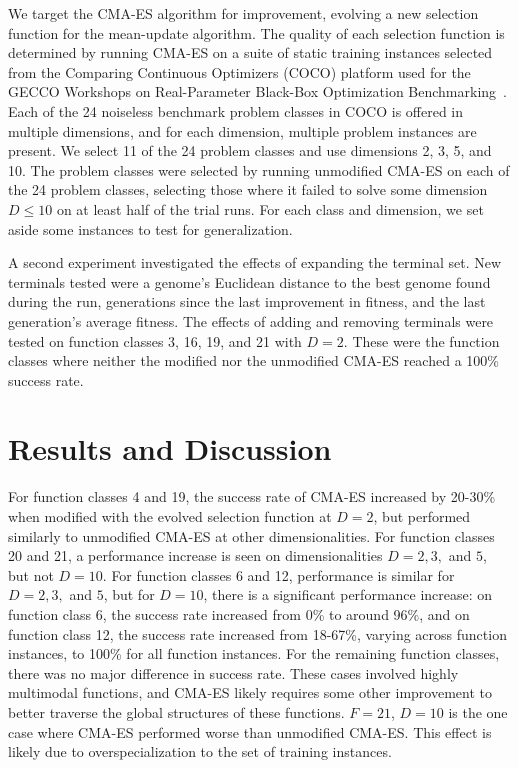 \documentclass[sigconf]{acmart}
\begin{document}
We target the CMA-ES algorithm for improvement, evolving a new selection function for the mean-update algorithm. The quality of each selection function is determined by running CMA-ES on a suite of static training instances selected from the Comparing Continuous Optimizers (COCO) platform used for the GECCO Workshops on Real-Parameter Black-Box Optimization Benchmarking~\citep{cocobbob}. Each of the 24 noiseless benchmark problem classes in COCO is offered in multiple dimensions, and for each dimension, multiple problem instances are present. We select 11 of the 24 problem classes and use dimensions 2, 3, 5, and 10. The problem classes were selected by running unmodified CMA-ES on each of the 24 problem classes, selecting those where it failed to solve some dimension $D \leq 10$ on at least half of the trial runs. For each class and dimension, we set aside some instances to test for generalization.

A second experiment investigated the effects of expanding the terminal set. New terminals tested were a genome's Euclidean distance to the best genome found during the run, generations since the last improvement in fitness, and the last generation's average fitness. The effects of adding and removing terminals were tested on function classes 3, 16, 19, and 21 with $D=2$. These were the function classes where neither the modified nor the unmodified CMA-ES reached a 100\% success rate. 

\section{Results and Discussion}
\label{Results}

For function classes 4 and 19, the success rate of CMA-ES increased by 20-30\% when modified with the evolved selection function at $D=2$, but performed similarly to unmodified CMA-ES at other dimensionalities. For function classes 20 and 21, a performance increase is seen on dimensionalities $D=2, 3,$ and $5$, but not $D=10$. For function classes 6 and 12, performance is similar for $D=2, 3,$ and $5$, but for $D=10$, there is a significant performance increase: on function class 6, the success rate increased from 0\% to around 96\%, and on function class 12, the success rate increased from 18-67\%, varying across function instances, to 100\% for all function instances. For the remaining function classes, there was no major difference in success rate. These cases involved highly multimodal functions, and CMA-ES likely requires some other improvement to better traverse the global structures of these functions. $F=21$, $D=10$ is the one case where CMA-ES performed worse than unmodified CMA-ES. This effect is likely due to overspecialization to the set of training instances. 
\end{document}
